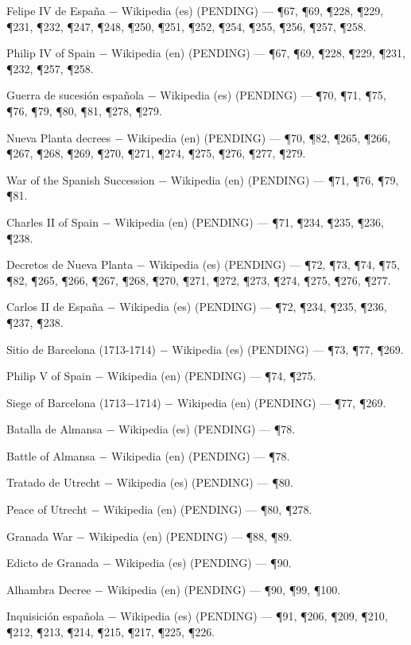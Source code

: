 \documentclass{book}
\begin{document}
\noindent Felipe IV de España \(-\) Wikipedia (es) (PENDING) --- \P67, \P69, \P228, \P229, \P231, \P232, \P247, \P248, \P250, \P251, \P252, \P254, \P255, \P256, \P257, \P258.

\noindent Philip IV of Spain \(-\) Wikipedia (en) (PENDING) --- \P67, \P69, \P228, \P229, \P231, \P232, \P257, \P258.

\noindent Guerra de sucesión española \(-\) Wikipedia (es) (PENDING) --- \P70, \P71, \P75, \P76, \P79, \P80, \P81, \P278, \P279.

\noindent Nueva Planta decrees \(-\) Wikipedia (en) (PENDING) --- \P70, \P82, \P265, \P266, \P267, \P268, \P269, \P270, \P271, \P274, \P275, \P276, \P277, \P279.

\noindent War of the Spanish Succession \(-\) Wikipedia (en) (PENDING) --- \P71, \P76, \P79, \P81.

\noindent Charles II of Spain \(-\) Wikipedia (en) (PENDING) --- \P71, \P234, \P235, \P236, \P238.

\noindent Decretos de Nueva Planta \(-\) Wikipedia (es) (PENDING) --- \P72, \P73, \P74, \P75, \P82, \P265, \P266, \P267, \P268, \P270, \P271, \P272, \P273, \P274, \P275, \P276, \P277.

\noindent Carlos II de España \(-\) Wikipedia (es) (PENDING) --- \P72, \P234, \P235, \P236, \P237, \P238.

\noindent Sitio de Barcelona (1713-1714) \(-\) Wikipedia (es) (PENDING) --- \P73, \P77, \P269.

\noindent Philip V of Spain \(-\) Wikipedia (en) (PENDING) --- \P74, \P275.

\noindent Siege of Barcelona (1713\(-\)1714) \(-\) Wikipedia (en) (PENDING) --- \P77, \P269.

\noindent Batalla de Almansa \(-\) Wikipedia (es) (PENDING) --- \P78.

\noindent Battle of Almansa \(-\) Wikipedia (en) (PENDING) --- \P78.

\noindent Tratado de Utrecht \(-\) Wikipedia (es) (PENDING) --- \P80.

\noindent Peace of Utrecht \(-\) Wikipedia (en) (PENDING) --- \P80, \P278.

\noindent Granada War \(-\) Wikipedia (en) (PENDING) --- \P88, \P89.

\noindent Edicto de Granada \(-\) Wikipedia (es) (PENDING) --- \P90.

\noindent Alhambra Decree \(-\) Wikipedia (en) (PENDING) --- \P90, \P99, \P100.

\noindent Inquisición española \(-\) Wikipedia (es) (PENDING) --- \P91, \P206, \P209, \P210, \P212, \P213, \P214, \P215, \P217, \P225, \P226.
\end{document}
